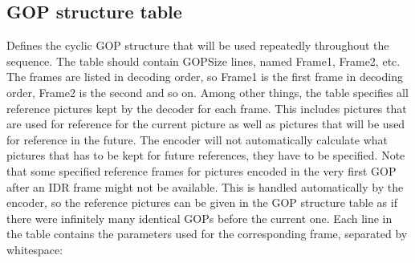 \documentclass[a4paper,11pt]{jctvcdoc}
\begin{document}
\subsection{GOP structure table}
\label{sec:gop-structure}
Defines the cyclic GOP structure that will be used repeatedly
throughout the sequence. The table should contain GOPSize lines,
named Frame1, Frame2, etc. The frames are listed in decoding
order, so Frame1 is the first frame in decoding order, Frame2 is
the second and so on. Among other things, the table specifies all
reference pictures kept by the decoder for each frame. This
includes pictures that are used for reference for the current
picture as well as pictures that will be used for reference in
the future. The encoder will not automatically calculate what
pictures that has to be kept for future references, they have to
be specified. Note that some specified reference frames for
pictures encoded in the very first GOP after an IDR frame might
not be available. This is handled automatically by the encoder,
so the reference pictures can be given in the GOP structure table
as if there were infinitely many identical GOPs before the
current one. Each line in the table contains the parameters used
for the corresponding frame, separated by whitespace:
\end{document}
